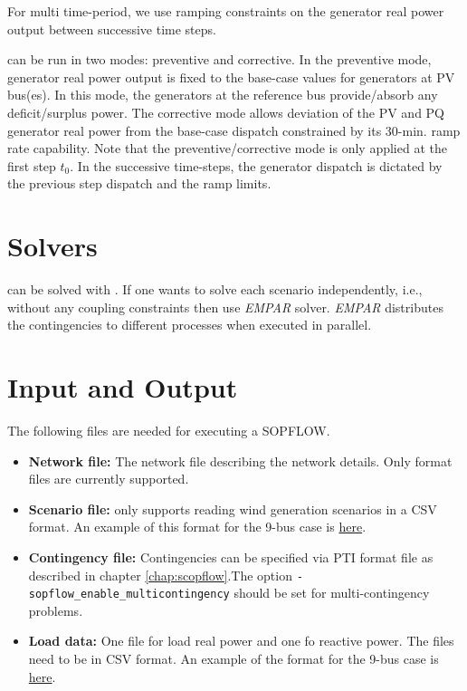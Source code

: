 For multi time-period, we use ramping constraints on the generator real power output between successive time steps.

\sopflow can be run in two modes: preventive and corrective. In the preventive mode, generator real power output is fixed to the base-case values for generators at PV bus(es). In this mode, the generators at the reference bus provide/absorb any deficit/surplus power. The corrective mode allows deviation of the PV and PQ generator real power from the base-case dispatch constrained by its 30-min. ramp rate capability. Note that the preventive/corrective mode is only applied at the first step $t_0$. In the successive time-steps, the generator dispatch is dictated by the previous step dispatch and the ramp limits.

\section{Solvers}
\sopflow can be solved with \ipopt. If one wants to solve each scenario independently, i.e., without any coupling constraints then use \emph{EMPAR} solver. \emph{EMPAR} distributes the contingencies to different processes when executed in parallel.

\section{Input and Output}
The following files are needed for executing a SOPFLOW.
\begin{itemize}
    \item \textbf{Network file:} The network file describing the network details. Only \matpower format files are currently supported.
    \item \textbf{Scenario file:} \sopflow only supports reading wind generation scenarios in a CSV format. An example of this format for the 9-bus case is \href{https://gitlab.pnnl.gov/exasgd/frameworks/exago/-/tree/master/datafiles/case9/scenarios_9bus.csv}{here}.
    \item \textbf{Contingency file:} Contingencies can be specified via PTI format file as described in chapter \ref{chap:scopflow}.The option \lstinline{-sopflow_enable_multicontingency} should be set for multi-contingency problems.
    \item \textbf{Load data:} One file for load real power and one fo reactive power. The files need to be in CSV format. An example of the format for the 9-bus case is \href{https://gitlab.pnnl.gov/exasgd/frameworks/exago/-/tree/master/datafiles/case9}{here}.
\end{itemize}

